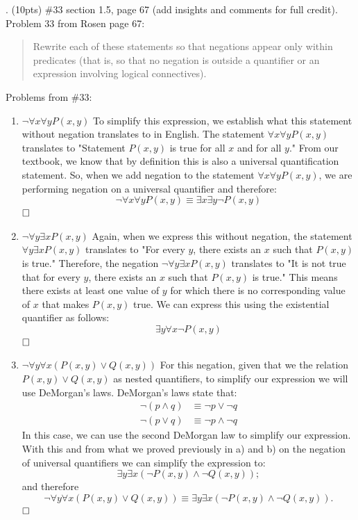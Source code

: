\documentclass{article}
\newcommand{\sectionbreak}{\clearpage}
\begin{document}
\sectionbreak
5. (10pts) \#33 section 1.5, page 67 (add insights and comments for full credit).
Problem 33 from Rosen page 67:
\begin{quote}
    Rewrite each of these statements so that negations appear only within predicates (that is, so that no negation is outside a quantifier or an expression involving logical connectives).
\end{quote}
Problems from \#33: 
\begin{enumerate}[label=(\alph*)]
    \item $\neg \forall x \forall yP(x,y)$
    \smallbreak
    To simplify this expression, we establish what this statement without negation translates to in English. The statement $\forall x \forall y P(x,y)$ translates to "Statement $P(x,y)$ is true for all $x$ and for all $y$." From our textbook, we know that by definition this is also a universal quantification statement. So, when we add negation to the statement $\forall x \forall y P(x,y)$, we are performing negation on a universal quantifier and therefore:
    \[\neg \forall x \forall yP(x,y) \equiv \exists x \exists y \neg P(x,y)\]
    $\hfill \square$

    \item $\neg \forall y \exists x P(x,y)$
    \smallbreak
    Again, when we express this without negation, the statement $\forall y \exists x P(x,y)$ translates to "For every $y$, there exists an $x$ such that $P(x,y)$ is true." Therefore, the negation $\neg \forall y \exists x P(x,y)$ translates to "It is not true that for every $y$, there exists an $x$ such that $P(x,y)$ is true." This means there exists at least one value of $y$ for which there is no corresponding value of $x$ that makes $P(x,y)$ true. We can express this using the existential quantifier as follows:
    \[\exists y \forall x \neg P(x,y)\]
    $\hfill \square$

    \item $\neg \forall y \forall x (P(x,y) \lor Q(x,y))$
    \smallbreak
    For this negation, given that we the relation $P(x,y) \lor Q(x,y)$ as nested quantifiers, to simplify our expression we will use DeMorgan's laws. DeMorgan's laws state that:
    \begin{align*}
        \neg (p \land q) &\equiv \neg p \lor \neg q \\
        \neg (p \lor q) &\equiv \neg p \land \neg q
    \end{align*}
    In this case, we can use the second DeMorgan law to simplify our expression. With this and from what we proved previously in a) and b) on the negation of universal quantifiers we can simplify the expression to:
    \[\exists y \exists x (\neg P(x,y) \land \neg Q(x,y));\]
    and therefore
    \[\neg \forall y \forall x (P(x,y) \lor Q(x,y)) \equiv \exists y \exists x (\neg P(x,y) \land \neg Q(x,y)).\]
    $\hfill \square$


\end{enumerate}
\end{document}
